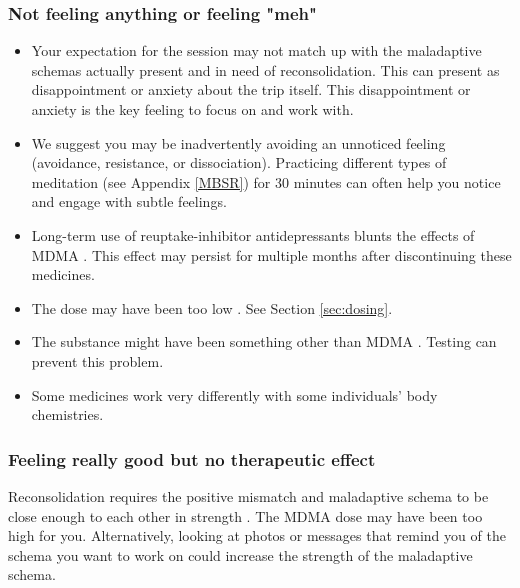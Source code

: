 \documentclass[12pt,letterpaper]{article}
\begin{document}
\subsubsection{Not feeling anything or feeling "meh"}
\begin{itemize}
    \item Your expectation for the session may not match up with the maladaptive schemas actually present and in need of reconsolidation. This can present as disappointment or anxiety about the trip itself. This disappointment or anxiety is the key feeling to focus on and work with.
    \item We suggest you may be inadvertently avoiding an unnoticed feeling (avoidance, resistance, or dissociation). Practicing different types of meditation (see Appendix \ref{MBSR}) for 30 minutes can often help you notice and engage with subtle feelings.
    \item Long-term use of reuptake-inhibitor antidepressants blunts the effects of MDMA \cite{feducciaSSRIDiscontinuation}. This effect may persist for multiple months after discontinuing these medicines.
    \item The dose may have been too low \cite{bediMDMALowDose}. See Section \ref{sec:dosing}.
    \item The substance might have been something other than MDMA \cite{saleemiAdulterants}. Testing can prevent this problem.
    \item Some medicines work very differently with some individuals' body chemistries.
\end{itemize}
\subsubsection{Feeling really good but no therapeutic effect}
Reconsolidation requires the positive mismatch and maladaptive schema to be close enough to each other in strength \cite{eckerUnlocking}. The MDMA dose may have been too high for you. Alternatively, looking at photos or messages that remind you of the schema you want to work on could increase the strength of the maladaptive schema.
\end{document}
